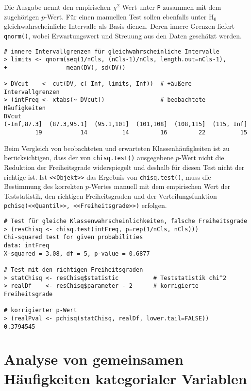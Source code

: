Die Ausgabe nennt den empirischen $\chi^{2}$-Wert unter \lstinline!P! zusammen mit dem zugehörigen $p$-Wert. Für einen manuellen Test sollen ebenfalls unter $\text{H}_{0}$ gleichwahrscheinliche Intervalle als Basis dienen. Deren innere Grenzen liefert \lstinline!qnorm()!, wobei Erwartungswert und Streuung aus den Daten geschätzt werden.
\begin{lstlisting}
# innere Intervallgrenzen für gleichwahrscheinliche Intervalle
> limits <- qnorm(seq(1/nCls, (nCls-1)/nCls, length.out=nCls-1),
+                 mean(DV), sd(DV))

> DVcut    <- cut(DV, c(-Inf, limits, Inf))  # +äußere Intervallgrenzen
> (intFreq <- xtabs(~ DVcut))                # beobachtete Häufigkeiten
DVcut
(-Inf,87.3]  (87.3,95.1]  (95.1,101]  (101,108]  (108,115]  (115, Inf]
         19           14          14         16         22          15
\end{lstlisting}

Beim Vergleich von beobachteten und erwarteten Klassenhäufigkeiten ist zu berücksichtigen, dass der von \lstinline!chisq.test()! ausgegebene $p$-Wert nicht die Reduktion der Freiheitsgrade widerspiegelt und deshalb für diesen Test nicht der richtige ist. Ist \lstinline!<<Objekt>>! das Ergebnis von \lstinline!chisq.test()!, muss die Bestimmung des korrekten $p$-Wertes manuell mit dem empirischen Wert der Teststatistik, den richtigen Freiheitsgraden und der Verteilungsfunktion \lstinline!pchisq(<<Quantil>>, <<Freiheitsgrade>>)! erfolgen.
\begin{lstlisting}
# Test für gleiche Klassenwahrscheinlichkeiten, falsche Freiheitsgrade
> (resChisq <- chisq.test(intFreq, p=rep(1/nCls, nCls)))
Chi-squared test for given probabilities
data: intFreq
X-squared = 3.08, df = 5, p-value = 0.6877

# Test mit den richtigen Freiheitsgraden
> statChisq <- resChisq$statistic          # Teststatistik chi^2
> realDf    <- resChisq$parameter - 2      # korrigierte Freiheitsgrade

# korrigierter p-Wert
> (realPval <- pchisq(statChisq, realDf, lower.tail=FALSE))
0.3794545
\end{lstlisting}

\section{Analyse von gemeinsamen Häufigkeiten kategorialer Variablen}
\label{sec:freqNonparam}

